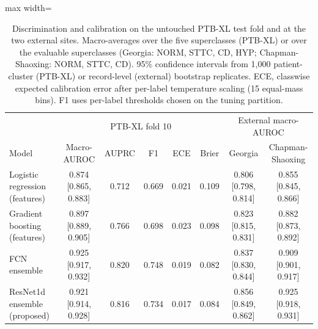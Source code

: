 \begin{table}[!htbp]
\centering\small
\caption{Discrimination and calibration on the untouched PTB-XL test fold and at the two external sites. Macro-averages over the five superclasses (PTB-XL) or over the evaluable superclasses (Georgia: NORM, STTC, CD, HYP; Chapman-Shaoxing: NORM, STTC, CD). 95\% confidence intervals from 1,000 patient-cluster (PTB-XL) or record-level (external) bootstrap replicates. ECE, classwise expected calibration error after per-label temperature scaling (15 equal-mass bins). F1 uses per-label thresholds chosen on the tuning partition.}
\label{tab:discrimination}
\setlength{\tabcolsep}{3.5pt}
\begin{adjustbox}{max width=\linewidth}
\begin{tabular}{lccccc|cc}
\toprule
 & \multicolumn{5}{c|}{PTB-XL fold 10} & \multicolumn{2}{c}{External macro-AUROC} \\
Model & Macro-AUROC & AUPRC & F1 & ECE & Brier & Georgia & Chapman-Shaoxing \\
\midrule
Logistic regression (features) & 0.874 [0.865, 0.883] & 0.712 & 0.669 & 0.021 & 0.109 & 0.806 [0.798, 0.814] & 0.855 [0.845, 0.866] \\
Gradient boosting (features) & 0.897 [0.889, 0.905] & 0.766 & 0.698 & 0.023 & 0.098 & 0.823 [0.815, 0.831] & 0.882 [0.873, 0.892] \\
FCN ensemble & 0.925 [0.917, 0.932] & 0.820 & 0.748 & 0.019 & 0.082 & 0.837 [0.830, 0.844] & 0.909 [0.901, 0.917] \\
ResNet1d ensemble (proposed) & 0.921 [0.914, 0.928] & 0.816 & 0.734 & 0.017 & 0.084 & 0.856 [0.849, 0.862] & 0.925 [0.918, 0.931] \\
\bottomrule
\end{tabular}
\end{adjustbox}
\end{table}
